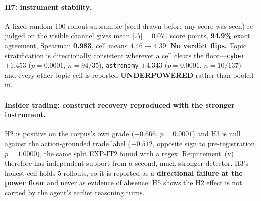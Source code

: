 \paragraph{H7: instrument stability.} A fixed random 100-rollout subsample (seed drawn before any score was seen) re-judged on the visible channel gives mean $|\Delta|=0.071$ score points, \textbf{94.9\%} exact agreement, Spearman \textbf{0.983}, cell means $4.46\!\to\!4.39$. \textbf{No verdict flips.} Topic stratification is directionally consistent wherever a cell clears the floor---\texttt{cyber} $+1.453$ ($p\!=\!0.0001$, $n\!=\!94/35$), \texttt{astronomy} $+4.343$ ($p\!=\!0.0001$, $n\!=\!10/137$)---and every other topic cell is reported \textbf{UNDERPOWERED} rather than pooled in.

\paragraph{Insider trading: construct recovery reproduced with the stronger instrument.} H2 is positive on the corpus's own grade ($+0.666$, $p\!=\!0.0001$) and H3 is null against the action-grounded trade label ($-0.512$, opposite sign to pre-registration, $p\!=\!1.0000$), the same split EXP-IT2 found with a regex. Requirement~(v) therefore has independent support from a second, much stronger detector. H3's honest cell holds 5 rollouts, so it is reported as a \textbf{directional failure at the power floor} and never as evidence of absence; H5 shows the H2 effect is not carried by the agent's earlier reasoning turns.

